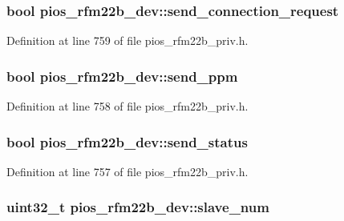 \hypertarget{structpios__rfm22b__dev_afd7377cf7b2ada828b83887653e4d3c2}{
\subsubsection[{send\-\_\-connection\-\_\-request}]{\setlength{\rightskip}{0pt plus 5cm}bool {\bf pios\-\_\-rfm22b\-\_\-dev\-::send\-\_\-connection\-\_\-request}}}\label{structpios__rfm22b__dev_afd7377cf7b2ada828b83887653e4d3c2}


\-Definition at line 759 of file pios\-\_\-rfm22b\-\_\-priv.\-h.

\hypertarget{structpios__rfm22b__dev_a44f9d9da0b1740ea9f077873f766ee45}{
\subsubsection[{send\-\_\-ppm}]{\setlength{\rightskip}{0pt plus 5cm}bool {\bf pios\-\_\-rfm22b\-\_\-dev\-::send\-\_\-ppm}}}\label{structpios__rfm22b__dev_a44f9d9da0b1740ea9f077873f766ee45}


\-Definition at line 758 of file pios\-\_\-rfm22b\-\_\-priv.\-h.

\hypertarget{structpios__rfm22b__dev_abf332b1a47bf1d07fbc580382acd4b95}{
\subsubsection[{send\-\_\-status}]{\setlength{\rightskip}{0pt plus 5cm}bool {\bf pios\-\_\-rfm22b\-\_\-dev\-::send\-\_\-status}}}\label{structpios__rfm22b__dev_abf332b1a47bf1d07fbc580382acd4b95}


\-Definition at line 757 of file pios\-\_\-rfm22b\-\_\-priv.\-h.

\hypertarget{structpios__rfm22b__dev_a4e0db01351dfac40720073969a7fafae}{
\subsubsection[{slave\-\_\-num}]{\setlength{\rightskip}{0pt plus 5cm}uint32\-\_\-t {\bf pios\-\_\-rfm22b\-\_\-dev\-::slave\-\_\-num}}}\label{structpios__rfm22b__dev_a4e0db01351dfac40720073969a7fafae}


